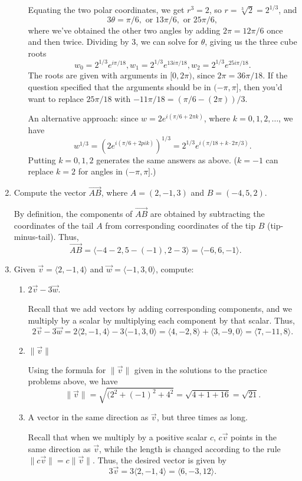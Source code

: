\documentclass[12pt]{article}
\newcommand{\len}[1]{\lVert #1\rVert}
\begin{document}
\begin{enumerate}
\begin{enumerate}
    Equating the two polar coordinates, we get $r^3=2$, so $r=\sqrt[3]{2}=2^{1/3}$, and
    \[
    3\theta = \pi/6, \text{ or } 13\pi/6, \text{ or } 25\pi/6,
    \]
    where we've obtained the other two angles by adding $2\pi = 12\pi/6$ once and then twice. Dividing by 3, we can solve for $\theta$, giving us the three cube roots
    \[
    w_0 = 2^{1/3}e^{i\pi/18}, w_1 = 2^{1/3}e^{13i\pi/18}, w_2 = 2^{1/3}e^{25i\pi/18}.
    \]
    The roots are given with arguments in $[0,2\pi)$, since $2\pi = 36\pi/18$. If the question specified that the arguments should be in $(-\pi,\pi]$, then you'd want to replace $25\pi/18$ with $-11\pi/18 = (\pi/6-(2\pi))/3$.
    
    \bigskip
    
    An alternative approach: since $w=2e^{i(\pi/6+2\pi k)}$, where $k=0,1,2,\ldots$, we have
    \[
    w^{1/3}=(2e^{i(\pi/6+2pi k)})^{1/3}=2^{1/3}e^{i(\pi/18+k\cdot 2\pi/3)}.
    \]
    Putting $k=0,1,2$ generates the same answers as above. ($k=-1$ can replace $k=2$ for angles in $(-\pi,\pi]$.)
    
    \end{enumerate}
    
    \item Compute the vector $\overrightarrow{AB}$, where $A=(2,-1,3)$ and $B=(-4,5,2)$.
    
\medskip

    By definition, the components of $\overrightarrow{AB}$ are obtained by subtracting the coordinates of the tail $A$ from corresponding coordinates of the tip $B$ (tip-minus-tail). Thus,
    \[
    \overrightarrow{AB}=\langle -4-2, 5-(-1), 2-3\rangle = \langle -6, 6, -1\rangle.
    \]
    
    \item Given $\vec{v} = \langle 2,-1,4\rangle$ and $\vec{w} = \langle -1,3,0\rangle$, compute:
    \begin{enumerate}
    \item $2\vec{v}-3\vec{w}$.
    
    Recall that we add vectors by adding corresponding components, and we multiply by a scalar by multiplying each component by that scalar. Thus,
    \[
    2\vec{v}-3\vec{w} =2\langle 2, -1, 4\rangle -3\langle -1,3,0\rangle = \langle 4, -2, 8\rangle+\langle 3,-9, 0\rangle = \langle 7, -11, 8\rangle.
    \]
    
    \item $\len{\vec{v}}$
    
Using the formula for $\len{\vec{v}}$ given in the solutions to the practice problems above, we have
\[
\len{\vec{v}} = \sqrt{(2^2+(-1)^2+4^2}=\sqrt{4+1+16} = \sqrt{21}.
\]
    
    \item A vector in the same direction as $\vec{v}$, but three times as long.
    
    Recall that when we multiply by a positive scalar $c$, $c\vec{v}$ points in the same direction as $\vec{v}$, while the length is changed according to the rule $\len{c\vec{v}}=c\len{\vec{v}}$. Thus, the desired vector is given by
    \[
    3\vec{v} = 3\langle 2, -1, 4\rangle = \langle 6, -3, 12\rangle.
    \]
\end{enumerate}     
\end{enumerate}
  
\end{document}
